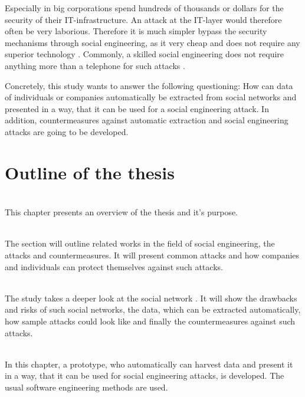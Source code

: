 Especially in big corporations spend hundreds of thousands or dollars for the
security of their IT-infrastructure. An attack at the IT-layer would therefore
often be very laborious. Therefore it is much simpler bypass the security
mechanisms through social engineering, as it very cheap and does not require
any superior technology \cite{winkler1995}. Commonly, a skilled social
engineering does not require anything more than a telephone for such attacks
\cite{mitnick2003}.

Concretely, this study wants to answer the following questioning:
How can data of individuals or companies automatically be extracted
from social networks and presented in a way, that it can be used for a social
engineering attack. In addition, countermeasures against automatic extraction
and social engineering attacks are going to be developed.

\section{Outline of the thesis}

\vspace{0.5em}\\
\noindent This chapter presents an overview of the thesis and it's purpose.

\vspace{0.5em}\\
\noindent The section will outline related works in the field of social
engineering, the attacks and countermeasures. It will present common attacks
and how companies and individuals can protect themselves against such attacks.

\vspace{0.5em}\\
\noindent The study takes a deeper look at the social network \Twitter. It will
show the drawbacks and risks of such social networks, the data, which can be
extracted automatically, how sample attacks could look like and finally the
countermeasures against such attacks.

\vspace{0.5em}\\
\noindent In this chapter, a prototype, who automatically can harvest data and
present it in a way, that it can be used for social engineering attacks, is
developed. The usual software engineering methods are used.

